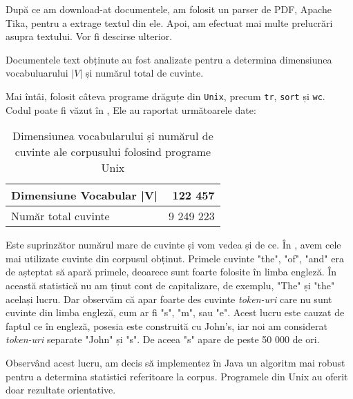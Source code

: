 După ce am download-at documentele, am folosit un parser de PDF, Apache Tika, pentru a extrage textul din ele. Apoi, am efectuat mai multe prelucrări asupra textului. Vor fi descirse ulterior.

Documentele text obținute au fost analizate pentru a determina dimensiunea vocabuluarului $|V|$ și numărul total de cuvinte.

Mai întâi, folosit câteva programe drăguțe din \texttt{Unix}, precum \texttt{tr}, \texttt{sort} și \texttt{wc}. Codul poate fi văzut în , Ele au raportat următoarele date:

\begin{center}
\begin{table}[htb]
  \caption{Dimensiunea vocabularului și numărul de cuvinte ale corpusului folosind programe Unix}
  \begin{tabular}{|l|r|}
    \hline
    Dimensiune Vocabular |V| & 122 457\\
    \hline
    Număr total cuvinte & 9 249 223 \\
     \hline
  \end{tabular}
  \label{table:vocabulary-size-bash}
\end{table}
\end{center}


\lstset{language=bash}
\lstset{caption=Comenzile Unix folosite pentru determinarea vocabularului, label=lst:vocabulary-size-bash}


Este suprinzător numărul mare de cuvinte și vom vedea și de ce. În , avem cele mai utilizate cuvinte din corpusul obținut. Primele cuvinte "the", "of", "and" era de așteptat să apară primele, deoarece sunt foarte folosite în limba engleză. În această statistică nu am ținut cont de capitalizare, de exemplu, "The" și "the" același lucru. Dar observăm că apar foarte des cuvinte \textit{token-uri} care nu sunt cuvinte din limba engleză, cum ar fi "s", "m", sau "e". Acest lucru este cauzat de faptul ce în engleză, posesia este construită cu John's, iar noi am considerat \textit{token-uri} separate "John" și "s". De aceea "s" apare de peste 50 000 de ori.

\lstset{language=make}
\lstset{caption=Cele mai folosite cuvinte din limba engleză pentru corpusul obținut folosind programe Unix, label=lst:top-words-bash}


Observând acest lucru, am decis să implementez în Java un algoritm mai robust pentru a determina statistici referitoare la corpus. Programele din Unix au oferit doar rezultate orientative.

